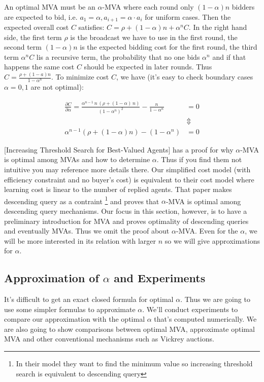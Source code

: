 An optimal MVA must be an $\alpha$-MVA where each round only $(1-\alpha) n$
bidders are expected to bid, i.e. $a_1 = \alpha, a_{i+1} = \alpha \cdot a_i$
for uniform cases. Then the expected overall cost $C$ satisfies: $ C = \rho +
(1-\alpha)n+\alpha^n C$. In the right hand side, the first term $\rho$ is the
broadcast we have to use in the first round, the second term $(1-\alpha)n$ is
the expected bidding cost for the first round, the third term $\alpha^n C$ lis
a recursive term, the probability that no one bids $\alpha^n$ and if that
happens the same cost $C$ should be expected in later rounds.  Thus $C = \frac{
\rho+(1-a)n }{ 1-\alpha^n }$. To minimize cost $C$, we have (it's easy to check
boundary cases $\alpha = 0, 1$ are not optimal):

\begin{align}\label{eq:alpha}
\frac{\partial C}{\partial \alpha} = \frac{{\alpha}^{n-1}\,n\,\left(
\rho+\left( 1-\alpha\right) \,n\right) }{{\left( 1-{\alpha}^{n}\right)
}^{2}}-\frac{n}{1-{\alpha}^{n}} &= 0 \nonumber\\
&\Updownarrow\nonumber\\
\alpha^{n-1} (\rho + (1-\alpha)n) - (1-\alpha^n) &= 0
\end{align}

[Increasing Threshold Search for Best-Valued Agents] has a proof for why
$\alpha$-MVA is optimal among MVAs and how to determine $\alpha$. Thus if you
find them not intuitive you may reference more details there.  Our simplified
cost model (with efficiency constraint and no buyer's cost) is equivalent to
their cost model where learning cost is linear to the number of replied agents.
That paper makes descending query as a contraint \footnote{In their model they
want to find the minimum value so increasing threshold search is equivalent to
descending query} and proves that $\alpha$-MVA is optimal among descending
query mechanisms. Our focus in this section, however, is to have a preliminary
introduction for MVA and proves optimality of descending queries and eventually
MVAs. Thus we omit the proof about $\alpha$-MVA. Even for the $\alpha$, we will
be more interested in its relation with larger $n$ so we will give
approximations for $\alpha$.

\subsection{Approximation of $\alpha$ and Experiments}

It's difficult to get an exact closed formula for optimal $\alpha$. Thus we are
going to use some simpler formulas to approximate $\alpha$. We'll conduct
experiments to compare our approximation with the optimal $\alpha$ that's
computed numerically. We are also going to show comparisons between optimal
MVA, approximate optimal MVA and other conventional mechanisms such as Vickrey
auctions.

